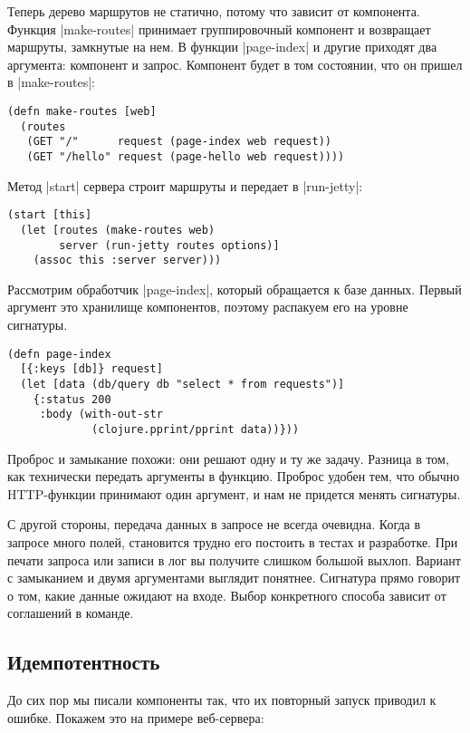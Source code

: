 Теперь дерево маршрутов не статично, потому что зависит от компонента. Функция
\spverb|make-routes| принимает группировочный компонент и возвращает маршруты,
замкнутые на нем. В функции \spverb|page-index| и другие приходят два аргумента:
компонент и запрос. Компонент будет в том состоянии, что он пришел в
\spverb|make-routes|:

\begin{verbatim}
(defn make-routes [web]
  (routes
   (GET "/"      request (page-index web request))
   (GET "/hello" request (page-hello web request))))
\end{verbatim}

Метод \spverb|start| сервера строит маршруты и передает в \spverb|run-jetty|:

\begin{verbatim}
(start [this]
  (let [routes (make-routes web)
        server (run-jetty routes options)]
    (assoc this :server server)))
\end{verbatim}

Рассмотрим обработчик \spverb|page-index|, который обращается к базе
данных. Первый аргумент это хранилище компонентов, поэтому распакуем его на
уровне сигнатуры.

\begin{verbatim}
(defn page-index
  [{:keys [db]} request]
  (let [data (db/query db "select * from requests")]
    {:status 200
     :body (with-out-str
             (clojure.pprint/pprint data))}))
\end{verbatim}

Проброс и замыкание похожи: они решают одну и ту же задачу. Разница в том, как
технически передать аргументы в функцию. Проброс удобен тем, что обычно
HTTP-функции принимают один аргумент, и нам не придется менять сигнатуры.

С другой стороны, передача данных в запросе не всегда очевидна. Когда в запросе
много полей, становится трудно его постоить в тестах и разработке. При печати
запроса или записи в лог вы получите слишком большой выхлоп. Вариант с
замыканием и двумя аргументами выглядит понятнее. Сигнатура прямо говорит о том,
какие данные ожидают на входе. Выбор конкретного способа зависит от соглашений в
команде.

\subsection{Идемпотентность}

До сих пор мы писали компоненты так, что их повторный запуск приводил к
ошибке. Покажем это на примере веб-сервера:

